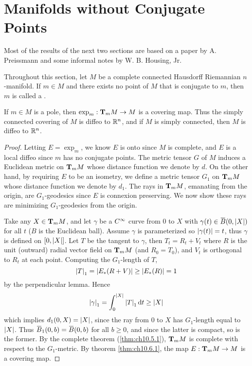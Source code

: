 \documentclass[../main]{subfiles}
\begin{document}
\section{Manifolds without Conjugate Points}\label{ch10:s7}

Most of the results of the next two sections are based on a paper by A. Preissmann and some informal notes by W. B. Housing, Jr.

Throughout this section, let $M$ be a complete connected Hausdorff Riemannian $n$-manifold. If $m\in M$ and there exists no point of $M$ that is conjugate to $m$, then $m$ is called a .



\begin{theorem} \label{thm:ch10.7.1}
If $m\in M$ is a pole, then $\exp_m:\ts Mm\functionMaps M$ is a covering map. Thus the simply connected covering of $M$ is diffeo to $\bR^n$, and if $M$ is simply connected, then $M$ is diffeo to $\bR^n$.
\end{theorem}

\begin{proof}
Letting $E=\exp_m$, we know $E$ is onto since $M$ is complete, and $E$ is a local diffeo since $m$ has no conjugate points. The metric tensor $G$ of $M$ induces a Euclidean metric on $\ts Mm$ whose distance function we denote by $d$. On the other hand, by requiring $E$ to be an isometry, we define a metric tensor $G_1$ on $\ts Mm$ whose distance function we denote by $d_1$. The rays in $\ts Mm$, emanating from the origin, are $G_1$-geodesics since $E$ is connexion preserving. We now show these rays are minimizing $G_1$-geodesics from the origin.

Take any $X\in\ts Mm$, and let $\gamma$ be a $\CInfty$ curve from 0 to $X$ with $\gamma(t)\in\xoverline B(0,\norm X)$ for all $t$ ($B$ is the Euclidean ball). Assume $\gamma$ is parameterized so $\norm{\gamma(t)}=t$, thus $\gamma$ is defined on $[0,\norm X]$. Let $T$ be the tangent to $\gamma$, then $T_t=R_t+V_t$ where $R$ is the unit (outward) radial vector field on $\ts Mm$ (and $R_0=T_0$), and $V_t$ is orthogonal to $R_t$ at each point. Computing the $G_1$-length of $T$,
\[\norm T_1 = \norm{E_*(R+V)} \ge \norm{E_*(R)} = 1\]
by the perpendicular lemma. Hence
\[\norm\gamma_1 = \int_0^{\norm X}\norm T_1\dd t \ge \norm X\]
which implies $d_1(0,X)=\norm X$, since the ray from 0 to $X$ has $G_1$-length equal to $\norm X$. Thus $\xoverline B_1(0,b)=\xoverline B(0,b)$ for all $b\ge0$, and since the latter is compact, so is the former. By the complete theorem (\ref{thm:ch10.5.1}), $\ts Mm$ is complete with respect to the $G_1$-metric. By theorem \ref{thm:ch10.6.1}, the map $E:\ts Mm\functionMaps M$ is a covering map.
\end{proof}
\end{document}
